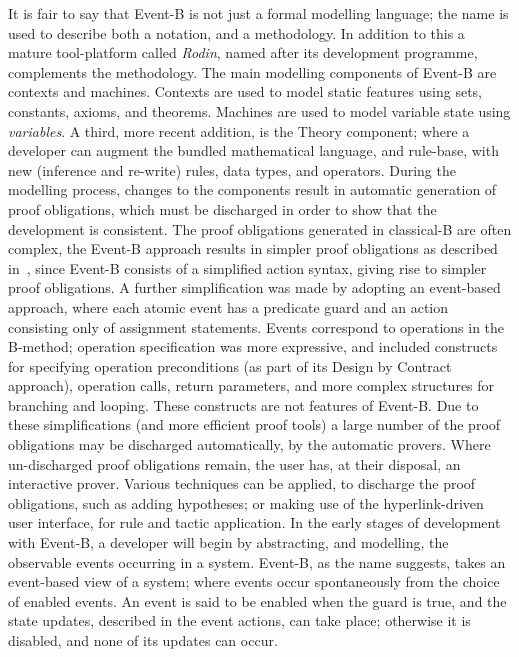 It is fair to say that Event-B is not just a formal modelling language; the name is used to describe both a notation, and a methodology. In addition to this a mature tool-platform called \emph{Rodin}, named after its development programme, complements the methodology. The main modelling components of Event-B are contexts and machines. Contexts are used to model static features using sets, constants, axioms, and theorems. Machines are used to model variable state using \emph{variables}. A third, more recent addition, is the Theory component; where a developer can augment the bundled mathematical language, and rule-base, with new (inference and re-write) rules, data types, and operators. During the modelling process, changes to the components result in automatic generation of proof obligations, which must be discharged in order to show that the development is consistent. The proof obligations generated in classical-B are often complex, the Event-B approach results in simpler proof obligations as described in~\cite{Hallerstede07}, since Event-B consists of a simplified action syntax, giving rise to simpler proof obligations. A further simplification was made by adopting an event-based approach, where each atomic event has a predicate guard and an action consisting only of assignment statements. Events correspond to operations in the B-method; operation specification was more expressive, and included constructs for specifying operation preconditions (as part of its Design by Contract approach), operation calls, return parameters, and more complex structures for branching and looping. These constructs are not features of Event-B. Due to these simplifications (and more efficient proof tools) a large number of the proof obligations may be discharged automatically, by the automatic provers. Where un-discharged proof obligations remain, the user has, at their disposal, an interactive prover. Various techniques can be applied, to discharge the proof obligations, such as adding hypotheses; or making use of the hyperlink-driven user interface, for rule and tactic application. In the early stages of development with Event-B, a developer will begin by abstracting, and modelling, the observable events occurring in a system. Event-B, as the name suggests, takes an event-based view of a system; where events occur spontaneously from the choice of enabled events. An event is said to be enabled when the guard is true, and the state updates, described in the event actions, can take place; otherwise it is disabled, and none of its updates can occur.  

